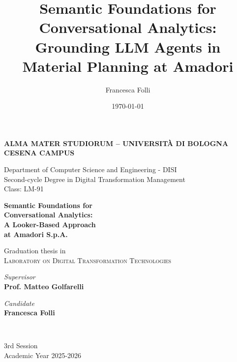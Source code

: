 \title{Semantic Foundations for Conversational Analytics: Grounding LLM Agents in Material Planning at Amadori}
\author{Francesca Folli}
\date{\today}

\begin{titlepage}
	\begin{center}
		
		\large
		\textbf{ALMA MATER STUDIORUM -- UNIVERSITÀ DI BOLOGNA \\ CESENA CAMPUS }
		\\
		\noindent\hrulefill
		\vspace{0.4cm}
		
		\Large
		Department of Computer Science and Engineering - DISI\\
		Second-cycle Degree in Digital Transformation Management\\
        Class: LM-91
		
		\Huge
		\vspace{4cm}
		\textbf{
			Semantic Foundations for
			\\
			Conversational Analytics:
			\\
			A Looker-Based Approach
			\\
			at Amadori S.p.A.
		}
		
		\large
		\vspace{1cm}
		Graduation thesis in 
		\\
		\textsc{Laboratory on Digital Transformation Technologies}
		
		\vspace{5.5cm}
		\begin{minipage}[t]{0.64\textwidth}
			\begin{flushleft}
				\textit{Supervisor} 
				\\ 
				  \textbf{Prof. Matteo Golfarelli}
				\\
			\end{flushleft}
		\end{minipage}
		\begin{minipage}[t]{0.34\textwidth}
			\begin{flushright}
				\textit{Candidate} 
				\\ 
				\textbf{Francesca Folli}
			\end{flushright}
		\end{minipage}\\
		
		\vfill
		\noindent\hrulefill
		\vspace{0.3cm}
		\Large
		
		3rd Session
		\\
		Academic Year 2025-2026
	\end{center}
\end{titlepage}
\restoregeometry
